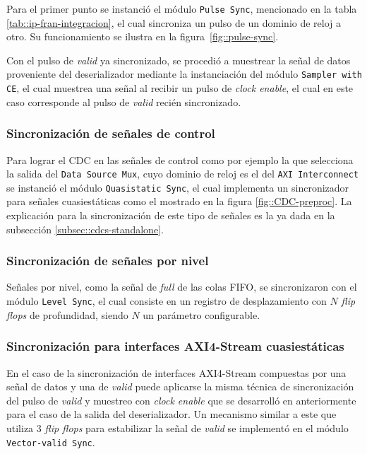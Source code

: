 \documentclass[../../main.tex]{subfiles}
\begin{document}
Para el primer punto se instanció el módulo \texttt{Pulse Sync}, mencionado en la tabla \ref{tab::ip-fran-integracion}, el cual sincroniza un pulso de un dominio de reloj a otro. Su funcionamiento se ilustra en la figura~\ref{fig::pulse-sync}.

Con el pulso de \textit{valid} ya sincronizado, se procedió a muestrear la señal de datos proveniente del deserializador mediante la instanciación del módulo \texttt{Sampler with CE}, el cual muestrea una señal al recibir un pulso de \textit{clock enable}, el cual en este caso corresponde al pulso de \textit{valid} recién sincronizado.


\subsubsection{Sincronización de señales de control}
Para lograr el CDC en las señales de control como por ejemplo la que selecciona la salida del \texttt{Data Source Mux}, cuyo dominio de reloj es el del \texttt{AXI Interconnect} se instanció el módulo \texttt{Quasistatic Sync}, el cual implementa un sincronizador para señales cuasiestáticas como el mostrado en la figura \ref{fig::CDC-preproc}. La explicación para la sincronización de este tipo de señales es la ya dada en la subsección \ref{subsec::cdcs-standalone}.

\subsubsection{Sincronización de señales por nivel}
Señales por nivel, como la señal de \textit{full} de las colas FIFO, se sincronizaron con el módulo \texttt{Level Sync}, el cual consiste en un registro de desplazamiento con $N$ \textit{flip flops} de profundidad, siendo $N$ un parámetro configurable.

\subsubsection{Sincronización para interfaces AXI4-Stream cuasiestáticas}
En el caso de la sincronización de interfaces AXI4-Stream compuestas por una señal de datos y una de \textit{valid} puede aplicarse la misma técnica de sincronización del pulso de \textit{valid} y muestreo con \textit{clock enable} que se desarrolló en anteriormente para el caso de la salida del deserializador. Un mecanismo similar a este que utiliza 3 \textit{flip flops} para estabilizar la señal de \textit{valid} se implementó en el módulo \texttt{Vector-valid Sync}.
\end{document}
